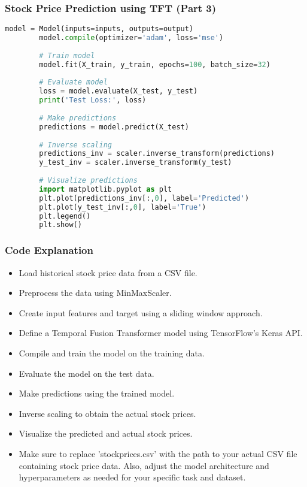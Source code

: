 \begin{frame}[fragile]
	\frametitle{Stock Price Prediction using TFT (Part 3)}
	
	\begin{lstlisting}[style=mystyle, language=Python, caption={Stock Price Prediction using TFT (Part 3)}]
		model = Model(inputs=inputs, outputs=output)
		model.compile(optimizer='adam', loss='mse')
		
		# Train model
		model.fit(X_train, y_train, epochs=100, batch_size=32)
		
		# Evaluate model
		loss = model.evaluate(X_test, y_test)
		print('Test Loss:', loss)
		
		# Make predictions
		predictions = model.predict(X_test)
		
		# Inverse scaling
		predictions_inv = scaler.inverse_transform(predictions)
		y_test_inv = scaler.inverse_transform(y_test)
		
		# Visualize predictions
		import matplotlib.pyplot as plt
		plt.plot(predictions_inv[:,0], label='Predicted')
		plt.plot(y_test_inv[:,0], label='True')
		plt.legend()
		plt.show()
	\end{lstlisting}
\end{frame}

\begin{frame}
	\frametitle{Code Explanation}
	\begin{itemize}
		\item Load historical stock price data from a CSV file.
		\item Preprocess the data using MinMaxScaler.
		\item Create input features and target using a sliding window approach.
		\item Define a Temporal Fusion Transformer model using TensorFlow's Keras API.
		\item Compile and train the model on the training data.
		\item Evaluate the model on the test data.
		\item Make predictions using the trained model.
		\item Inverse scaling to obtain the actual stock prices.
		\item Visualize the predicted and actual stock prices.
		\item Make sure to replace 'stockprices.csv' with the path to your actual CSV file containing stock price data. Also, adjust the model architecture and hyperparameters as needed for your specific task and dataset.
	\end{itemize}
\end{frame}


